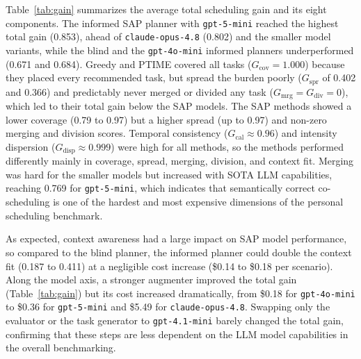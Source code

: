 \documentclass[runningheads]{llncs}
\begin{document}
Table~\ref{tab:gain} summarizes the average total scheduling gain and its eight components. The informed SAP planner with \texttt{gpt-5-mini} reached the highest total gain (0.853), ahead of \texttt{claude-opus-4.8} (0.802) and the smaller model variants, while the blind and the \texttt{gpt-4o-mini} informed planners underperformed (0.671 and 0.684). Greedy and PTIME covered all tasks ($G_{\text{cov}}=1.000$) because they placed every recommended task, but spread the burden poorly ($G_{\text{spr}}$ of 0.402 and 0.366) and predictably never merged or divided any task ($G_{\text{mrg}}=G_{\text{div}}=0$), which led to their total gain below the SAP models. The SAP methods showed a lower coverage (0.79 to 0.97) but a higher spread (up to 0.97) and non-zero merging and division scores. Temporal consistency ($G_{\text{cal}}\approx0.96$) and intensity dispersion ($G_{\text{disp}}\approx0.999$) were high for all methods, so the methods performed differently mainly in coverage, spread, merging, division, and context fit. Merging was hard for the smaller models but increased with SOTA LLM capabilities, reaching 0.769 for \texttt{gpt-5-mini}, which indicates that semantically correct co-scheduling is one of the hardest and most expensive dimensions of the personal scheduling benchmark.

As expected, context awareness had a large impact on SAP model performance, so compared to the blind planner, the informed planner could double the context fit (0.187 to 0.411) at a negligible cost increase (\$0.14 to \$0.18 per scenario). Along the model axis, a stronger augmenter improved the total gain (Table~\ref{tab:gain}) but its cost increased dramatically, from \$0.18 for \texttt{gpt-4o-mini} to \$0.36 for \texttt{gpt-5-mini} and \$5.49 for \texttt{claude-opus-4.8}. Swapping only the evaluator or the task generator to \texttt{gpt-4.1-mini} barely changed the total gain, confirming that these steps are less dependent on the LLM model capabilities in the overall benchmarking. 
\end{document}
